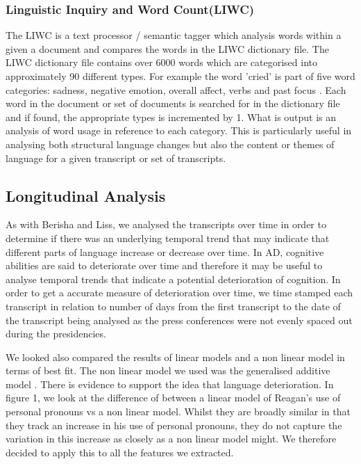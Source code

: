 \documentclass[12pt]{article}
\begin{document}
\subsubsection{Linguistic Inquiry and Word Count(LIWC)}
The LIWC is a text processor / semantic tagger which analysis words within a given a document and compares the words in the LIWC dictionary file. The LIWC dictionary file contains over 6000 words which are categorised into approximately 90 different types. For example the word 'cried' is part of five word categories: sadness, negative emotion, overall affect, verbs and past focus \cite{Pennebaker2015}. Each word in the document or set of documents is searched for in the dictionary file and if found, the appropriate types is incremented by 1. What is output is an analysis of word usage in reference to each category. This is particularly useful in analysing both structural language changes but also the content or themes of language for a given transcript or set of transcripts.

\subsection{Longitudinal Analysis}
As with Berisha and Liss\cite{Berisha2015}, we analysed the transcripts over time in order to determine if there was an underlying temporal trend that may indicate that different parts of language increase or decrease over time. In AD, cognitive abilities are said to deteriorate over time and therefore it may be useful to analyse temporal trends that indicate a potential deterioration of cognition. In order to get a accurate measure of deterioration over time, we time stamped each transcript in relation to number of days from the first transcript to the date of the transcript being analysed as the press conferences were not evenly spaced out during the presidencies.
\par
We looked also compared the results of linear models and a non linear model in terms of best fit. The non linear model we used was the generalised additive model \cite{Hastie1986}.
There is evidence to support the idea that language deterioration. In figure 1, we look at the difference of between a linear model of Reagan's use of personal pronouns vs a non linear model. Whilst they are broadly similar in that they track an increase in his use of personal pronouns, they do not capture the variation in this increase as closely as a non linear model might. We therefore decided to apply this to all the features we extracted.
\end{document}
